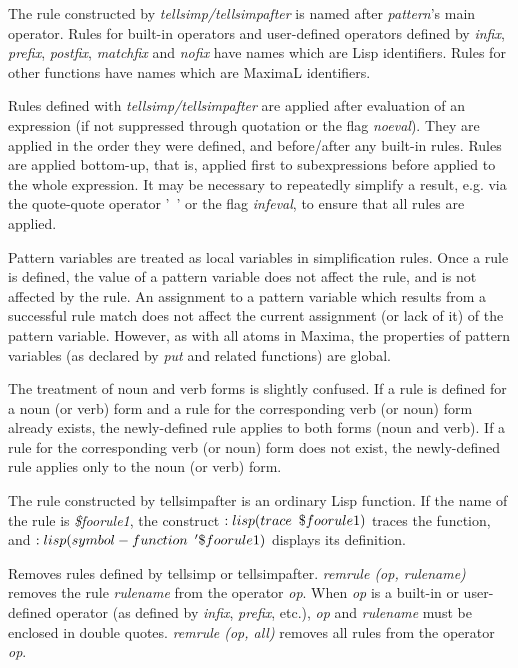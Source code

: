 \documentclass[../Maxima_Workbook.tex]{subfiles}
\begin{document}
\lz The rule constructed by\emph{ tellsimp/tellsimpafter} is named after \emph{pattern}'s main operator. Rules for built-in operators and user-defined operators defined by \emph{infix}, \emph{prefix}, \emph{postfix}, \emph{matchfix} and \emph{nofix} have names which are Lisp identifiers. Rules for other functions have names which are MaximaL identifiers.

\lz Rules defined with \emph{tellsimp/tellsimpafter} are applied after evaluation of an expression (if not suppressed through quotation or the flag \emph{noeval}). They are applied in the order they were defined, and before/after any built-in rules. Rules are applied bottom-up, that is, applied first to subexpressions before applied to the whole expression. It may be necessary to repeatedly simplify a result, e.g. via the quote-quote operator '\ ' or the flag \emph{infeval}, to ensure that all rules are applied.

\lz Pattern variables are treated as local variables in simplification rules. Once a rule is defined, the value of a pattern variable does not affect the rule, and is not affected by the rule. An assignment to a pattern variable which results from a successful rule match does not affect the current assignment (or lack of it) of the pattern variable. However, as with all atoms in Maxima, the properties of pattern variables (as declared by \emph{put} and related functions) are global.

\lz The treatment of noun and verb forms is slightly confused. If a rule is defined for a noun (or verb) form and a rule for the corresponding verb (or noun) form already exists, the newly-defined rule applies to both forms (noun and verb). If a rule for the corresponding verb (or noun) form does not exist, the newly-defined rule applies only to the noun (or verb) form.

\lz The rule constructed by tellsimpafter is an ordinary Lisp function. If the name of the rule is \emph{\$foorule1}, the construct $ :lisp (trace \enskip \$foorule1) $ traces the function, and $ :lisp (symbol-function \enskip '\$foorule1) $ displays its definition.

\lzz {} \hfill \tcr{[function]}

\lz Removes rules defined by tellsimp or tellsimpafter. \emph{remrule (op, rulename)} removes the rule \emph{rulename} from the operator \emph{op}. When \emph{op} is a built-in or user-defined operator (as defined by \emph{infix}, \emph{prefix}, etc.), \emph{op} and \emph{rulename} must be enclosed in double quotes. \emph{remrule (op, all)} removes all rules from the operator \emph{op}.
\end{document}
